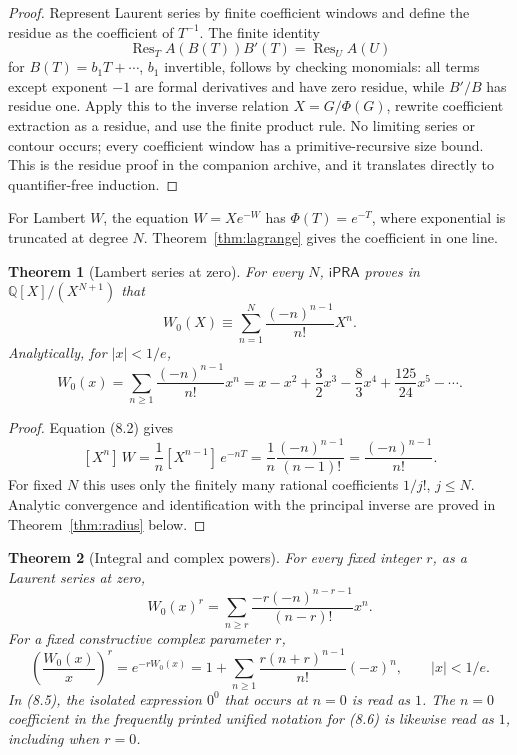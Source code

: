 \documentclass[11pt]{article}
\newtheorem{theorem}{Theorem}[section]
\theoremstyle{definition}
\newcommand{\Q}{\mathbb Q}
\newcommand{\iPRA}{\mathsf{iPRA}}
\newcommand{\abs}[1]{\left|#1\right|}
\newcommand{\coeff}[2]{[X^{#1}]\,#2}
\begin{document}
\begin{proof}
Represent Laurent series by finite coefficient windows and define the residue
as the coefficient of \(T^{-1}\).  The finite identity
\[
 \operatorname{Res}_T A(B(T))B'(T)=\operatorname{Res}_U A(U)
\]
for \(B(T)=b_1T+\cdots\), \(b_1\) invertible, follows by checking monomials:
all terms except exponent \(-1\) are formal derivatives and have zero residue,
while \(B'/B\) has residue one.  Apply this to the inverse relation
\(X=G/\Phi(G)\), rewrite coefficient extraction as a residue, and use the
finite product rule.  No limiting series or contour occurs; every coefficient
window has a primitive-recursive size bound.  This is the residue proof in the
companion archive, and it translates directly to quantifier-free induction.
\end{proof}

For Lambert \(W\), the equation \(W=Xe^{-W}\) has
\(\Phi(T)=e^{-T}\), where exponential is truncated at degree \(N\).
Theorem~\ref{thm:lagrange} gives the coefficient in one line.

\begin{theorem}[Lambert series at zero]\label{thm:W-series}
For every \(N\), \(\iPRA\) proves in \(\Q[X]/(X^{N+1})\) that
\[
 W_0(X)\equiv
 \sum_{n=1}^{N}\frac{(-n)^{n-1}}{n!}X^n.
 \tag{8.3}
\]
Analytically, for \(\abs{x}<1/e\),
\[
 W_0(x)=\sum_{n\ge1}\frac{(-n)^{n-1}}{n!}x^n
 =x-x^2+\frac32x^3-\frac83x^4+\frac{125}{24}x^5-\cdots.
 \tag{8.4}
\]
\end{theorem}

\begin{proof}
Equation (8.2) gives
\[
 \coeff{n}{W}=\frac1n\coeff{n-1}{e^{-nT}}
 =\frac1n\frac{(-n)^{n-1}}{(n-1)!}
 =\frac{(-n)^{n-1}}{n!}.
\]
For fixed \(N\) this uses only the finitely many rational coefficients
\(1/j!\), \(j\le N\).  Analytic convergence and identification with the
principal inverse are proved in Theorem~\ref{thm:radius} below.
\end{proof}

\begin{theorem}[Integral and complex powers]\label{thm:powers}
For every fixed integer \(r\), as a Laurent series at zero,
\[
 W_0(x)^r
 =\sum_{n\ge r}
   \frac{-r(-n)^{n-r-1}}{(n-r)!}x^n.
 \tag{8.5}
\]
For a fixed constructive complex parameter \(r\),
\[
 \left(\frac{W_0(x)}x\right)^r=e^{-rW_0(x)}
 =1+\sum_{n\ge1}\frac{r(n+r)^{n-1}}{n!}(-x)^n,
 \qquad \abs{x}<1/e.
 \tag{8.6}
\]
In (8.5), the isolated expression \(0^0\) that occurs at \(n=0\) is read as
\(1\).  The \(n=0\) coefficient in the frequently printed unified notation
for (8.6) is likewise read as \(1\), including when \(r=0\).
\end{theorem}
\end{document}
